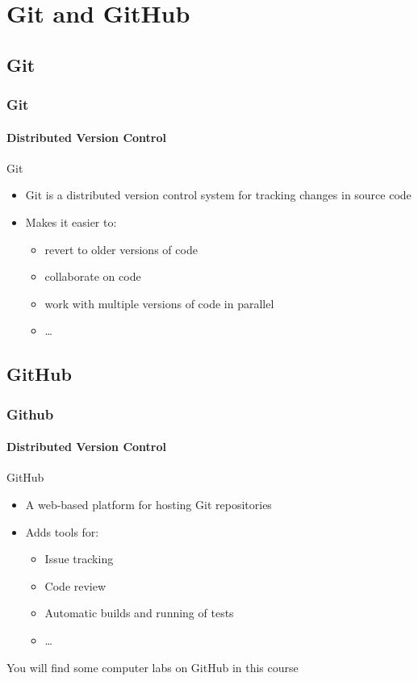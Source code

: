 \documentclass[aspectratio=169,dvipsnames]{beamer}
\begin{document}
\appendix
\section{Git and GitHub}
\subsection{Git}
\begin{frame}
    \frametitle{Git}
    \framesubtitle{Distributed Version Control}
    \begin{block}{Git}
        \begin{itemize}
            \item Git is a distributed version control system for tracking changes in source code
            \item Makes it easier to:
            \begin{itemize}
                \item revert to older versions of code
                \item collaborate on code
                \item work with multiple versions of code in parallel
                \item \ldots
            \end{itemize}
        \end{itemize}
    \end{block}
\end{frame}

\subsection{GitHub}
\begin{frame}
    \frametitle{Github}
    \framesubtitle{Distributed Version Control}
        \begin{block}{GitHub}
        \begin{itemize}
            \item A web-based platform for hosting Git repositories
            \item Adds tools for:
            \begin{itemize}
                \item Issue tracking
                \item Code review
                \item Automatic builds and running of tests
                \item \ldots
            \end{itemize}
        \end{itemize}
        \end{block}

        \begin{center}
            You will find some computer labs on GitHub in this course
        \end{center}
\end{frame}
\end{document}
